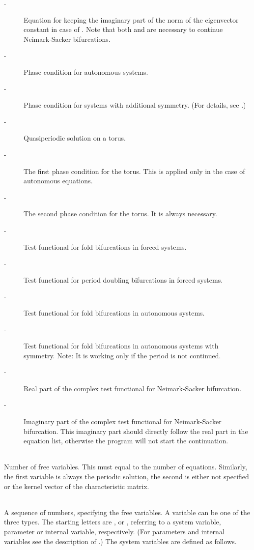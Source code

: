 \documentclass[10pt,a4paper]{ddedoc}
\begin{document}
\begin{description}
\begin{description}
\item[ -] Equation for keeping the imaginary part of the norm of the eigenvector constant in case of . Note that both  and  are necessary to continue Neimark-Sacker bifurcations.
\item[ -] Phase condition for autonomous systems.
\item[ -] Phase condition for systems with additional symmetry. (For details, see \cite{haegeman}.)
\item[ -] Quasiperiodic solution on a torus.
\item[ -] The first phase condition for the torus. This is applied only in the case of autonomous equations.
\item[ -] The second phase condition for the torus. It is always necessary.
\item[ -] Test functional for fold bifurcations in forced systems.
\item[ -] Test functional for period doubling bifurcations in forced systems.
\item[ -] Test functional for fold bifurcations in autonomous systems.
\item[ -] Test functional for fold bifurcations in autonomous systems with symmetry. Note: It is working only if the period is not continued.
\item[ -] Real part of the complex test functional for Neimark-Sacker bifurcation.
\item[ -] Imaginary part of the complex test functional for Neimark-Sacker bifurcation. This imaginary part should directly follow the real part in the equation list, otherwise the program will not start the continuation.
\end{description}
\item[\funp{NVAR}] ~\\
	Number of free variables. This must equal to the number of equations. Similarly, the first variable is always the periodic solution, the second is either not specified or the kernel vector of the characteristic matrix.
\item[\funp{VAR}] ~\\
	A sequence of numbers, specifying the free variables. A variable can be one of the three types. The starting letters are ,  or , referring to a system variable, parameter or internal variable, respectively. (For parameters and internal variables see the description of .) The system variables are defined as follows.

\end{description}
\end{document}
